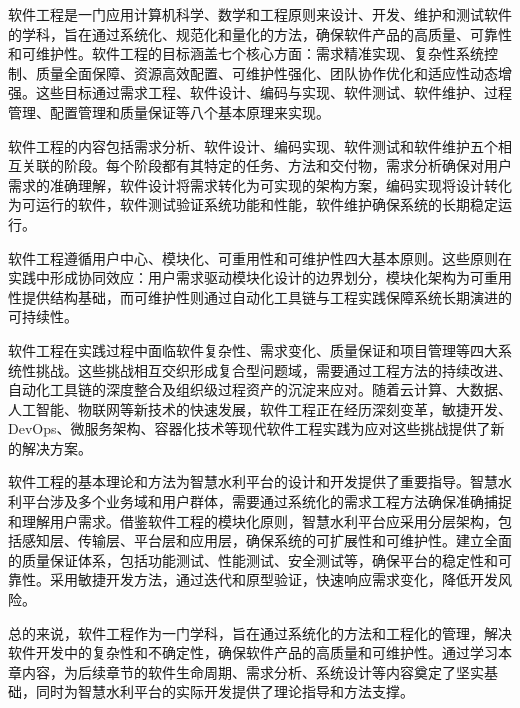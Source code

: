 \documentclass[12pt,a4paper]{ctexbook}
\begin{document}
软件工程是一门应用计算机科学、数学和工程原则来设计、开发、维护和测试软件的学科，旨在通过系统化、规范化和量化的方法，确保软件产品的高质量、可靠性和可维护性。软件工程的目标涵盖七个核心方面：需求精准实现、复杂性系统控制、质量全面保障、资源高效配置、可维护性强化、团队协作优化和适应性动态增强。这些目标通过需求工程、软件设计、编码与实现、软件测试、软件维护、过程管理、配置管理和质量保证等八个基本原理来实现。

软件工程的内容包括需求分析、软件设计、编码实现、软件测试和软件维护五个相互关联的阶段。每个阶段都有其特定的任务、方法和交付物，需求分析确保对用户需求的准确理解，软件设计将需求转化为可实现的架构方案，编码实现将设计转化为可运行的软件，软件测试验证系统功能和性能，软件维护确保系统的长期稳定运行。

软件工程遵循用户中心、模块化、可重用性和可维护性四大基本原则。这些原则在实践中形成协同效应：用户需求驱动模块化设计的边界划分，模块化架构为可重用性提供结构基础，而可维护性则通过自动化工具链与工程实践保障系统长期演进的可持续性。

软件工程在实践过程中面临软件复杂性、需求变化、质量保证和项目管理等四大系统性挑战。这些挑战相互交织形成复合型问题域，需要通过工程方法的持续改进、自动化工具链的深度整合及组织级过程资产的沉淀来应对。随着云计算、大数据、人工智能、物联网等新技术的快速发展，软件工程正在经历深刻变革，敏捷开发、DevOps、微服务架构、容器化技术等现代软件工程实践为应对这些挑战提供了新的解决方案。

软件工程的基本理论和方法为智慧水利平台的设计和开发提供了重要指导。智慧水利平台涉及多个业务域和用户群体，需要通过系统化的需求工程方法确保准确捕捉和理解用户需求。借鉴软件工程的模块化原则，智慧水利平台应采用分层架构，包括感知层、传输层、平台层和应用层，确保系统的可扩展性和可维护性。建立全面的质量保证体系，包括功能测试、性能测试、安全测试等，确保平台的稳定性和可靠性。采用敏捷开发方法，通过迭代和原型验证，快速响应需求变化，降低开发风险。

总的来说，软件工程作为一门学科，旨在通过系统化的方法和工程化的管理，解决软件开发中的复杂性和不确定性，确保软件产品的高质量和可维护性。通过学习本章内容，为后续章节的软件生命周期、需求分析、系统设计等内容奠定了坚实基础，同时为智慧水利平台的实际开发提供了理论指导和方法支撑。
\end{document}
